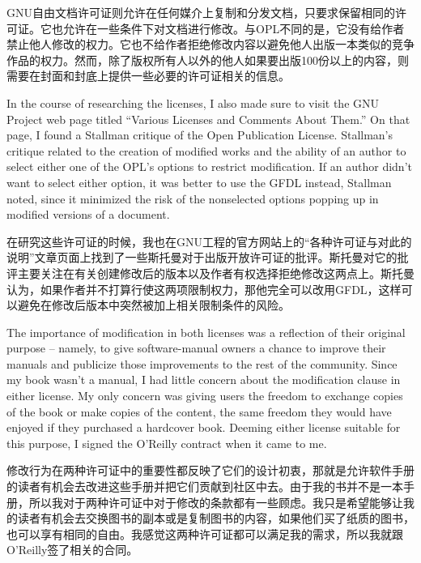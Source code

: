\ifdefined\chs
GNU自由文档许可证则允许在任何媒介上复制和分发文档，只要求保留相同的许可证。它也允许在一些条件下对文档进行修改。与OPL不同的是，它没有给作者禁止他人修改的权力。它也不给作者拒绝修改内容以避免他人出版一本类似的竞争作品的权力。然而，除了版权所有人以外的他人如果要出版100份以上的内容，则需要在封面和封底上提供一些必要的许可证相关的信息。
\fi

\ifdefined\eng
In the course of researching the licenses, I also made sure to visit the GNU Project web page titled ``Various Licenses and Comments About Them.'' On that page, I found a Stallman critique of the Open Publication License. Stallman's critique related to the creation of modified works and the ability of an author to select either one of the OPL's options to restrict modification. If an author didn't want to select either option, it was better to use the GFDL instead, Stallman noted, since it minimized the risk of the nonselected options popping up in modified versions of a document.
\fi

\ifdefined\chs
在研究这些许可证的时候，我也在GNU工程的官方网站上的``各种许可证与对此的说明''文章页面上找到了一些斯托曼对于出版开放许可证的批评。斯托曼对它的批评主要关注在有关创建修改后的版本以及作者有权选择拒绝修改这两点上。斯托曼认为，如果作者并不打算行使这两项限制权力，那他完全可以改用GFDL，这样可以避免在修改后版本中突然被加上相关限制条件的风险。
\fi

\ifdefined\eng
The importance of modification in both licenses was a reflection of their original purpose -- namely, to give software-manual owners a chance to improve their manuals and publicize those improvements to the rest of the community. Since my book wasn't a manual, I had little concern about the modification clause in either license. My only concern was giving users the freedom to exchange copies of the book or make copies of the content, the same freedom they would have enjoyed if they purchased a hardcover book. Deeming either license suitable for this purpose, I signed the O'Reilly contract when it came to me.
\fi

\ifdefined\chs
修改行为在两种许可证中的重要性都反映了它们的设计初衷，那就是允许软件手册的读者有机会去改进这些手册并把它们贡献到社区中去。由于我的书并不是一本手册，所以我对于两种许可证中对于修改的条款都有一些顾虑。我只是希望能够让我的读者有机会去交换图书的副本或是复制图书的内容，如果他们买了纸质的图书，也可以享有相同的自由。我感觉这两种许可证都可以满足我的需求，所以我就跟O'Reilly签了相关的合同。
\fi


